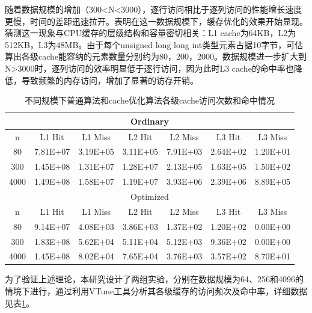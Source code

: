 \documentclass[a4paper]{article}
\begin{document}
                随着数据规模的增加（300<N<3000），逐行访问相比于逐列访问的性能增长速度更慢，时间的差距迅速拉开。表明在这一数据规模下，缓存优化的效果开始显现。猜测这一现象与CPU缓存的层级结构和容量密切相关：L1 cache为64KB，L2为512KB，L3为48MB。由于每个unsigned long long int类型元素占据10字节，可估算出各级cache能容纳的元素数量分别约为80，200，2000。数据规模进一步扩大到N>3000时，逐列访问的效率明显低于逐行访问，因为此时L3 cache的命中率也降低，导致频繁的内存访问，增加了显著的访存开销。
                \begin{table}[h]
                    \centering
                    \caption{不同规模下普通算法和cache优化算法各级cache访问次数和命中情况}
                    \label{tab:cache_performance}
                    \begin{tabular}{|c|c|c|c|c|c|c|}
                    \hline
                    \multicolumn{7}{|c|}{Ordinary} \\
                    \hline
                    n & L1 Hit & L1 Miss & L2 Hit & L2 Miss & L3 Hit & L3 Miss \\
                    \hline
                    80 & 7.81E+07 & 3.19E+05 & 3.11E+05 & 7.91E+03 & 2.64E+02 & 1.20E+01 \\
                    300 & 1.45E+08 & 1.31E+07 & 1.28E+07 & 2.13E+05 & 1.63E+05 & 1.50E+02 \\
                    4000 & 1.49E+08 & 1.58E+07 & 1.19E+07 & 3.93E+06 & 2.39E+06 & 8.89E+05 \\
                    \hline
                    \multicolumn{7}{|c|}{Optimized} \\
                    \hline
                    n & L1 Hit & L1 Miss & L2 Hit & L2 Miss & L3 Hit & L3 Miss \\
                    \hline
                    80 & 9.14E+07 & 4.08E+03 & 3.86E+03 & 1.37E+02 & 1.20E+02 & 0.00E+00 \\
                    300 & 1.83E+08 & 5.62E+04 & 5.11E+04 & 5.12E+03 & 9.36E+02 & 0.00E+00 \\
                    4000 & 1.45E+08 & 8.02E+04 & 7.65E+04 & 3.76E+03 & 3.57E+02 & 8.70E+01 \\
                    \hline
                    \end{tabular}
                \end{table}
                
为了验证上述理论，本研究设计了两组实验，分别在数据规模为64、256和4096的情境下进行，通过利用VTune工具分析其各级缓存的访问频次及命中率，详细数据见表\ref{tab:cache_performance}。
\end{document}
